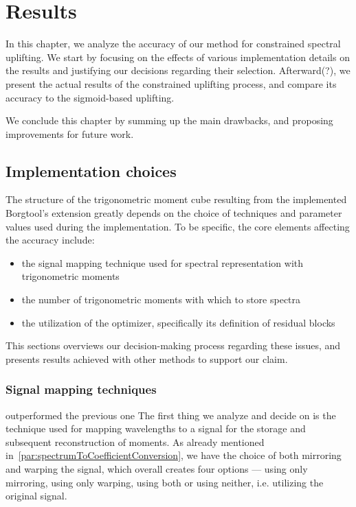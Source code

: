 \chapter{Results} \label{chap:results}

In this chapter, we analyze the accuracy of our method for constrained spectral uplifting. We start by focusing on the effects of various implementation details on the results and justifying our decisions regarding their selection. Afterward(?), we present the actual results of the constrained uplifting process, and compare its accuracy to the sigmoid-based uplifting.

We conclude this chapter by summing up the main drawbacks, and proposing improvements for future work.

\section{Implementation choices}

The structure of the trigonometric moment cube resulting from the implemented Borgtool's extension greatly depends on the choice of techniques and parameter values used during the implementation. To be specific, the core elements affecting the accuracy include:
\begin{itemize}
	\item the signal mapping technique used for spectral representation with trigonometric moments
	\item the number of trigonometric moments with which to store spectra
	\item the utilization of the optimizer, specifically its definition of residual blocks
\end{itemize}

This sections overviews our decision-making process regarding these issues, and presents results achieved with other methods to support our claim.

\subsection{Signal mapping techniques} \label{sec:storingMoments}
outperformed the previous one
The first thing we analyze and decide on is the technique used for mapping wavelengths to a signal for the storage and subsequent reconstruction of moments. As already mentioned in~\cref{par:spectrumToCoefficientConversion}, we have the choice of both mirroring and warping the signal, which overall creates four options --- using only mirroring, using only warping, using both or using neither, i.e. utilizing the original signal.

